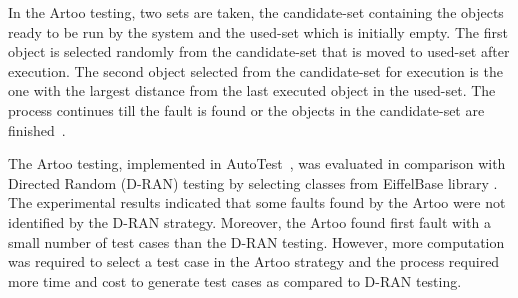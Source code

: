 In the Artoo testing, two sets are taken, the candidate-set containing the objects ready to be run by the system and the used-set which is initially empty. The first object is selected randomly from the candidate-set that is moved to used-set after execution. The second object selected from the candidate-set for execution is the one with the largest distance from the last executed object in the used-set. The process continues till the fault is found or the objects in the candidate-set are finished~\cite{ciupa2006object}.

The Artoo testing, implemented in AutoTest~\cite{ciupa2008artoo}, was evaluated in comparison with Directed Random (D-RAN) testing \cite{godefroid2005dart} by selecting classes from EiffelBase library \cite{meyer1987eiffel}. The experimental results indicated that some faults found by the Artoo were not identified by the D-RAN strategy. Moreover, the Artoo found first fault with a small number of test cases than the D-RAN testing. However, more computation was required to select a test case in the Artoo strategy and the process required more time and cost to generate test cases as compared to D-RAN testing.



